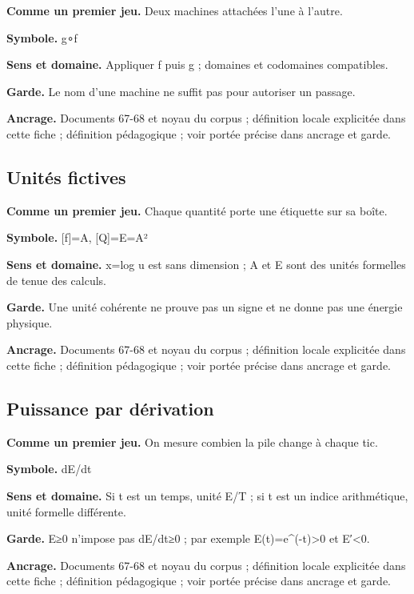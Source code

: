 \documentclass[
  9pt,
  a4paper,
]{article}
\begin{document}
\textbf{Comme un premier jeu.} Deux machines attachées l'une à l'autre.

\textbf{Symbole.} g∘f

\textbf{Sens et domaine.} Appliquer f puis g ; domaines et codomaines
compatibles.

\textbf{Garde.} Le nom d'une machine ne suffit pas pour autoriser un
passage.

\textbf{Ancrage.} Documents 67-68 et noyau du corpus ; définition locale
explicitée dans cette fiche ; définition pédagogique ; voir portée
précise dans ancrage et garde.

\hypertarget{unituxe9s-fictives}{%
\subsection{Unités fictives}\label{unituxe9s-fictives}}

\textbf{Comme un premier jeu.} Chaque quantité porte une étiquette sur
sa boîte.

\textbf{Symbole.} {[}f{]}=A, {[}Q{]}=E=A²

\textbf{Sens et domaine.} x=log u est sans dimension ; A et E sont des
unités formelles de tenue des calculs.

\textbf{Garde.} Une unité cohérente ne prouve pas un signe et ne donne
pas une énergie physique.

\textbf{Ancrage.} Documents 67-68 et noyau du corpus ; définition locale
explicitée dans cette fiche ; définition pédagogique ; voir portée
précise dans ancrage et garde.

\hypertarget{puissance-par-duxe9rivation}{%
\subsection{Puissance par
dérivation}\label{puissance-par-duxe9rivation}}

\textbf{Comme un premier jeu.} On mesure combien la pile change à chaque
tic.

\textbf{Symbole.} dE/dt

\textbf{Sens et domaine.} Si t est un temps, unité E/T ; si t est un
indice arithmétique, unité formelle différente.

\textbf{Garde.} E≥0 n'impose pas dE/dt≥0 ; par exemple
E(t)=e\^{}(-t)\textgreater0 et E′\textless0.

\textbf{Ancrage.} Documents 67-68 et noyau du corpus ; définition locale
explicitée dans cette fiche ; définition pédagogique ; voir portée
précise dans ancrage et garde.
\end{document}
